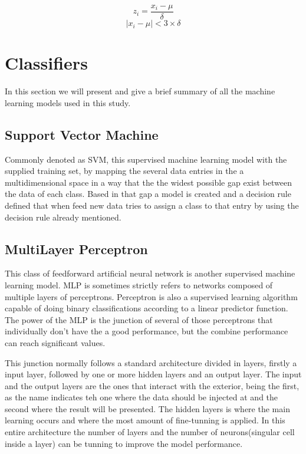 \documentclass[conference]{IEEEtran}
\begin{document}
\begin{multicols}{2}
    \begin{equation}\label{zscore}
        z_{i} = \frac{x_{i} - \mu}{\delta}
    \end{equation}
    \break
    \begin{equation}\label{outliers}
        |x_{i}-\mu| < 3\times\delta
    \end{equation}
\end{multicols}

\section{Classifiers}
In this section we will present and give a brief summary of all the machine learning models used in this study.

\subsection{Support Vector Machine}
Commonly denoted as SVM, this supervised machine learning model with the supplied training set, by mapping the several data entries in the a multidimensional space in a way that the the widest possible gap exist between the data of each class. Based in that gap a model is created and a decision rule defined that when feed new data tries to assign a class to that entry by using the decision rule already mentioned.

\subsection{MultiLayer Perceptron}
This class of feedforward artificial neural network is another supervised machine learning model. MLP is sometimes strictly refers to networks composed of multiple layers of perceptrons. Perceptron is also a supervised learning algorithm capable of doing binary classifications according to a linear predictor function. The power of the MLP is the junction of several of those perceptrons that individually don't have the a good performance, but the combine performance can reach significant values.

This junction normally follows a standard architecture divided in layers, firstly a input layer, followed by one or more hidden layers and an output layer. The input and the output layers are the ones that interact with the exterior, being the first, as the name indicates teh one where the data should be injected at and the second where the result will be presented. The hidden layers is where the main learning occurs and where the most amount of fine-tunning is applied. In this entire architecture the number of layers and the number of neurons(singular cell inside a layer) can be tunning to improve the model performance.
\end{document}

